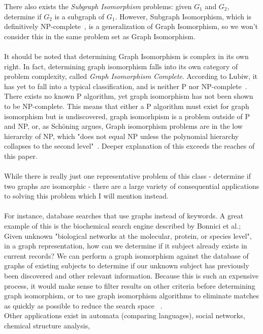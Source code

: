 \documentclass[letterpaper, 11pt]{article}
\begin{document}
    There also exists the \textit{Subgraph Isomorphism} problems: given $G_1$ and $G_2$,
    determine if $G_2$ is a subgraph of $G_1$. However, Subgraph Isomorphism, which is definitively NP-complete~\cite{cook1971complexity},
    is a generalization of Graph Isomorphism, so we won't consider this in the same problem set as Graph Isomorphism.
    \\\\
    It should be noted that determining
    Graph Isomorphism is complex in its own right. In fact, determining graph isomorphism falls
    into its own category of problem complexity, called \textit{Graph Isomorphism Complete}.
    According to Lubiw, it has yet to fall into a typical classification, and is neither P nor NP-complete~\cite{anna-complexity}.
    There exists no known P algorithm, yet graph isomorphism has not been shown to be NP-complete. This means that either a P algorithm
    must exist for graph isomorphism but is undiscovered, graph isomorhpism is a problem outside of
    P and NP, or, as Schöning argues, Graph isomorphism problems are in the low hierarchy of NP,
    which "does not equal NP unless the polynomial hierarchy collapses to the second level"~\cite{np-hierarchy}.
    Deeper explanation of this exceeds the reaches of this paper.
    \\
    \\
    While there is really just one representative problem of this class - determine if two graphs are isomorphic -
    there are a large variety of consequential applications to solving this problem which I will mention instead.\\\\ For instance,
    database searches that use graphs instead of keywords. A great example of this is the biochemical search
    engine described by Bonnici et al.; Given unknown "biological networks at the molecular, protein, or species level",
    in a graph representation, how can we determine if it subject already exists in current records?
    We can perform a graph isomorphism against the database of graphs of existing subjects
    to determine if our unknown subject has previously been discovered and other relevant information.
    Because this is such an expensive process, it would make sense to filter results on other criteria
    before determining graph isomorphism, or to use graph isomorphism algorithms to eliminate matches
    as quickly as possible to reduce the search space ~\cite{Bonnici2013}.
    \\
    Other applications exist in automata (comparing languages), social networks, chemical structure analysis,
\end{document}
